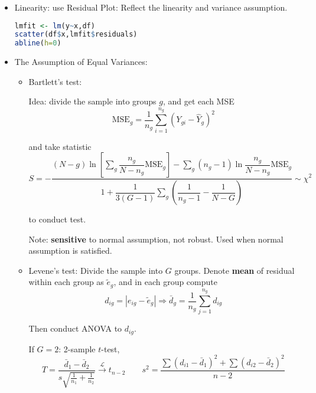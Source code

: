 \begin{itemize}[topsep=2pt,itemsep=2pt]
    \item Linearity: use Residual Plot: Reflect the linearity and variance assumption.
\begin{rcode}
\begin{lstlisting}[language=R]
lmfit <- lm(y~x,df)
scatter(df$x,lmfit$residuals)
abline(h=0)
\end{lstlisting}

\end{rcode}
    \item The Assumption of Equal Variances:
    \begin{itemize}[topsep=2pt,itemsep=2pt]
        \item Bartlett's test:
        
        Idea: divide the sample into groups $ g $, and get each MSE
        \begin{equation}
             \mathrm{MSE}_g=\dfrac{1}{n_g}\sum_{i=1}^{n_g}(Y_{gi}-\hat{Y}_g)^2
        \end{equation}
        
        and take statistic
        \begin{equation}
            S=-\dfrac{(N-g)\ln\left[ \sum\limits_g \dfrac{n_g}{N-n_g}\mathrm{MSE}_g \right]-\sum\limits_{g}(n_g-1)\ln \dfrac{n_g}{N-n_g}\mathrm{MSE}_g }{1+\dfrac{1}{3(G-1)}\sum\limits_g\left( \dfrac{1}{n_g-1}-\dfrac{1}{N-G} \right)} \sim \chi^2
        \end{equation}

        to conduct test. 

        Note: \textbf{sensitive}  to normal assumption, not robust. Used when normal assumption is satisfied.
        \item Levene's test: Divide the sample into $ G $ groups. Denote \textbf{mean}  of residual within each group as $ \tilde{e}_g $, and in each group compute
        \begin{equation}
            d_{ig}=|e_{ig}-\tilde{e}_g| \Rightarrow \bar{d}_{g}=\dfrac{1}{n_g}\sum_{j=1}^{n_g}d_{ig}
        \end{equation}

        Then conduct ANOVA to $ d_{ig} $.

        If $ G=2 $: 2-sample $ t $-test,
        \begin{equation}
            T=\dfrac{\bar{d}_1-\bar{d}_2}{s\sqrt{\frac{1}{n_1}+\frac{1}{n_2}}}\xrightarrow[]{\mathscr{L}} t_{n-2}\qquad s^2=\dfrac{\sum(d_{i1}-\bar{d}_1)^2+\sum(d_{i2}-\bar{d}_2 )^2}{n-2}
        \end{equation}
        


\end{itemize}
\end{itemize}
